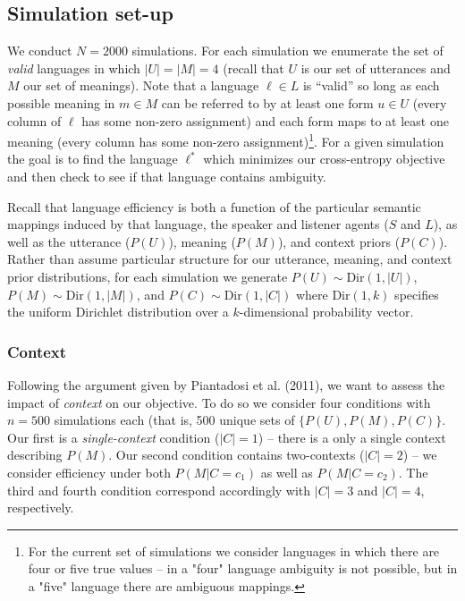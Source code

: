 \documentclass[10pt, letterpaper]{article}
\begin{document}
\subsection{Simulation set-up}\label{simulation-set-up}

We conduct \(N=2000\) simulations. For each simulation we enumerate the
set of \emph{valid} languages in which \(|U|=|M|=4\) (recall that \(U\)
is our set of utterances and \(M\) our set of meanings). Note that a
language \(\ell \in L\) is ``valid'' so long as each possible meaning in
\(m \in M\) can be referred to by at least one form \(u \in U\) (every
column of \(\ell\) has some non-zero assignment) and each form maps to
at least one meaning (every column has some non-zero
assignment)\footnote{For the current set of simulations we consider languages in which there are four or five true values -- in a "four" language ambiguity is not possible, but in a "five" language there are ambiguous mappings.}.
For a given simulation the goal is to find the language \(\ell^*\) which
minimizes our cross-entropy objective and then check to see if that
language contains ambiguity.\par

Recall that language efficiency is both a function of the particular
semantic mappings induced by that language, the speaker and listener
agents (\(S\) and \(L\)), as well as the utterance (\(P(U)\)), meaning
(\(P(M)\)), and context priors (\(P(C)\)). Rather than assume particular
structure for our utterance, meaning, and context prior distributions,
for each simulation we generate \(P(U) \sim \text{Dir}(1, |U|)\),
\(P(M) \sim \text{Dir}(1, |M|)\), and \(P(C) \sim \text{Dir}(1, |C|)\)
where \(\text{Dir}(1, k)\) specifies the uniform Dirichlet distribution
over a \(k\)-dimensional probability vector.\par

\subsubsection{Context}\label{context}

Following the argument given by Piantadosi et al. (2011), we want to
assess the impact of \emph{context} on our objective. To do so we
consider four conditions with \(n=500\) simulations each (that is, 500
unique sets of \(\{P(U), P(M), P(C)\}\). Our first is a
\emph{single-context} condition (\(|C|=1\)) -- there is a only a single
context describing \(P(M)\). Our second condition contains two-contexts
(\(|C| = 2\)) -- we consider efficiency under both \(P(M|C=c_1)\) as
well as \(P(M|C=c_2)\). The third and fourth condition correspond
accordingly with \(|C|=3\) and \(|C| = 4\), respectively.\par
\end{document}
